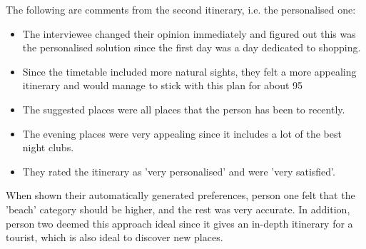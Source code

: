 The following are comments from the second itinerary, i.e. the personalised one:
\begin{itemize}
\item The interviewee changed their opinion immediately and figured out this was the personalised solution since the first day was a day dedicated to shopping. 
\item Since the timetable included more natural sights, they felt a more appealing itinerary and would manage to stick with this plan for about 95%
\item The suggested places were all places that the person has been to recently.
\item The evening places were very appealing since it includes a lot of the best night clubs.
\item They rated the itinerary as 'very personalised' and were 'very satisfied'.
\end{itemize}
When shown their automatically generated preferences, person one felt that the
'beach' category should be higher, and the rest was very accurate. In addition, person two deemed this approach ideal since it gives an in-depth itinerary for a tourist, which is also ideal to discover new places.


